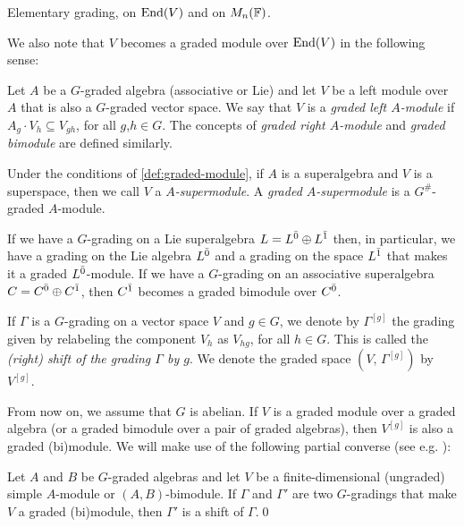 \begin{defi}\label{defi:elementary-grd}
    Elementary grading, on $\operatorname{End}(V)$ and on $M_n(\mathbb{F})$.
\end{defi}

We also note that $V$ becomes a graded module over $\operatorname{End}(V)$ in the following sense:

\begin{defi}\label{def:graded-module}
	Let $A$ be a $G$-graded algebra (associative or Lie) and let $V$ be a left module over $A$ that is also a $G$-graded vector space. 
	We say that $V$ is a \emph{graded left $A$-module} if $A_g \cdot V_h \subseteq V_{gh}$, for all $g$,$h\in G$. 
	The concepts of \emph{graded right $A$-module} and \emph{graded bimodule} are defined similarly.
\end{defi}

Under the conditions of \cref{def:graded-module}, if $A$ is a superalgebra and $V$ is a superspace, then we call $V$ a \emph{$A$-supermodule}. 
A \emph{graded $A$-supermodule} is a $G^\#$-graded $A$-module.

If we have a $G$-grading on a Lie superalgebra $L=L^{\bar0} \oplus L^{\bar1}$ then, in particular, we have a grading on the Lie algebra $L^{\bar0}$ and a grading on the space $L^{\bar1}$ that makes it a graded $L^{\bar0}$-module. If we have a $G$-grading on an associative superalgebra $C=C^{\bar0} \oplus C^{\bar1}$, then $C^{\bar1}$ becomes a graded bimodule over $C^{\bar0}$.

If $ \Gamma$ is a $G$-grading on a vector space $V$ and $g\in G$, we denote by $\Gamma^{[g]} $ the grading given by relabeling the component
$V_h$ as $V_{hg}$, for all $h \in G$. This is called the \emph{(right) shift of the grading $\Gamma$ by $g$}.
We denote the graded space $(V, \,  \Gamma^{[g]})$ by $V^{[g]}$.

From now on, we assume that $G$ is abelian.
If $V$ is a graded module over a graded algebra (or a graded bimodule over a pair of graded algebras), then $V^{[g]}$ is also a graded (bi)module.
We will make use of the following partial converse (see e.g. \cite[Proposition 3.5]{paper-Qn}):

\begin{lemma}\label{lemma:simplebimodule}
	Let $A$ and $B$ be $G$-graded algebras and let $V$ be a finite-dimensional (ungraded) simple $A$-module or $(A,B)$-bimodule.  If $\Gamma$ and $\Gamma'$ are  two $G$-gradings that make $V$ a graded (bi)module, then $\Gamma'$ is a  shift of $\Gamma$.\qed
\end{lemma}

